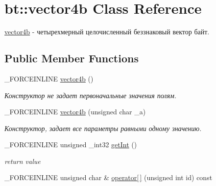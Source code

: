 \hypertarget{classbt_1_1vector4b}{\section{bt\-:\-:vector4b Class Reference}
\label{classbt_1_1vector4b}
}


\hyperlink{classbt_1_1vector4b}{vector4b} -\/ четырехмерный целочисленный беззнаковый вектор байт.  


\subsection*{Public Member Functions}
\begin{DoxyCompactItemize}
\item 
\hypertarget{classbt_1_1vector4b_ac0a7cff2d05cc35f068af66375c8b6f5}{\-\_\-\-F\-O\-R\-C\-E\-I\-N\-L\-I\-N\-E \hyperlink{classbt_1_1vector4b_ac0a7cff2d05cc35f068af66375c8b6f5}{vector4b} ()}\label{classbt_1_1vector4b_ac0a7cff2d05cc35f068af66375c8b6f5}

\begin{DoxyCompactList}\small\item\em Конструктор не задает первоначальные значения полям. \end{DoxyCompactList}\item 
\hypertarget{classbt_1_1vector4b_a49e5165f5aa0fda634cfb193763bc456}{\-\_\-\-F\-O\-R\-C\-E\-I\-N\-L\-I\-N\-E \hyperlink{classbt_1_1vector4b_a49e5165f5aa0fda634cfb193763bc456}{vector4b} (unsigned char \-\_\-a)}\label{classbt_1_1vector4b_a49e5165f5aa0fda634cfb193763bc456}

\begin{DoxyCompactList}\small\item\em Конструктор, задает все параметры равными одному значению. \end{DoxyCompactList}\item 
\hypertarget{classbt_1_1vector4b_a7ca9eb3f53ee3e2af64e816ad3745fa4}{\-\_\-\-F\-O\-R\-C\-E\-I\-N\-L\-I\-N\-E unsigned \-\_\-int32 \hyperlink{classbt_1_1vector4b_a7ca9eb3f53ee3e2af64e816ad3745fa4}{get\-Int} ()}\label{classbt_1_1vector4b_a7ca9eb3f53ee3e2af64e816ad3745fa4}

\begin{DoxyCompactList}\small\item\em return value \end{DoxyCompactList}\item 
\hypertarget{classbt_1_1vector4b_ae974e57508f6bf7f6766edf8fb00327e}{\-\_\-\-F\-O\-R\-C\-E\-I\-N\-L\-I\-N\-E unsigned char \& \hyperlink{classbt_1_1vector4b_ae974e57508f6bf7f6766edf8fb00327e}{operator\mbox{[}$\,$\mbox{]}} (unsigned int id) const }\label{classbt_1_1vector4b_ae974e57508f6bf7f6766edf8fb00327e}


\end{DoxyCompactItemize}
